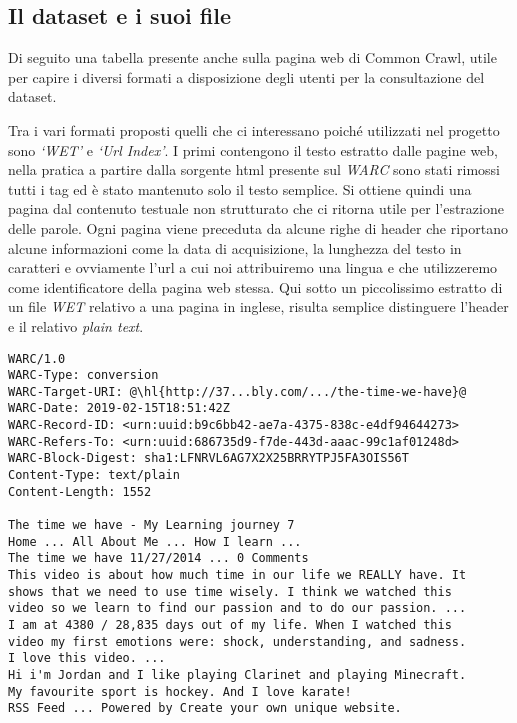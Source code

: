 \documentclass{article}
\newcommand{\WET}{\textit{WET}}
\newcommand{\CC}{Common Crawl}
\newcommand{\pt}{\textit{plain text}}
\begin{document}
\subsection{Il dataset e i suoi file}

Di seguito una tabella presente anche sulla pagina web di \CC{}, utile per capire i diversi formati a disposizione degli utenti per la consultazione del dataset.

\commonCrawlFilesTable

Tra i vari formati proposti quelli che ci interessano poiché utilizzati nel progetto sono \textit{`WET'} e \textit{`Url Index'}. I primi contengono il testo estratto dalle pagine web, nella pratica a partire dalla sorgente html presente sul \textit{WARC} sono stati rimossi tutti i tag ed è stato mantenuto solo il testo semplice. Si ottiene quindi una pagina dal contenuto testuale non strutturato che ci ritorna utile per l'estrazione delle parole. Ogni pagina viene preceduta da alcune righe di header che riportano alcune informazioni come la data di acquisizione, la lunghezza del testo in caratteri e ovviamente l'url a cui noi attribuiremo una lingua e che utilizzeremo come identificatore della pagina web stessa. Qui sotto un piccolissimo estratto di un file \WET{} relativo a una pagina in inglese, risulta semplice distinguere l'header e il relativo \pt{}.

\begin{verbatim}
WARC/1.0
WARC-Type: conversion
WARC-Target-URI: @\hl{http://37...bly.com/.../the-time-we-have}@
WARC-Date: 2019-02-15T18:51:42Z
WARC-Record-ID: <urn:uuid:b9c6bb42-ae7a-4375-838c-e4df94644273>
WARC-Refers-To: <urn:uuid:686735d9-f7de-443d-aaac-99c1af01248d>
WARC-Block-Digest: sha1:LFNRVL6AG7X2X25BRRYTPJ5FA3OIS56T
Content-Type: text/plain
Content-Length: 1552

The time we have - My Learning journey 7
Home ... All About Me ... How I learn ...
The time we have 11/27/2014 ... 0 Comments
This video is about how much time in our life we REALLY have. It 
shows that we need to use time wisely. I think we watched this 
video so we learn to find our passion and to do our passion. ...
I am at 4380 / 28,835 days out of my life. When I watched this 
video my first emotions were: shock, understanding, and sadness. 
I love this video. ...
Hi i'm Jordan and I like playing Clarinet and playing Minecraft. 
My favourite sport is hockey. And I love karate!
RSS Feed ... Powered by Create your own unique website.
\end{verbatim}
\end{document}
